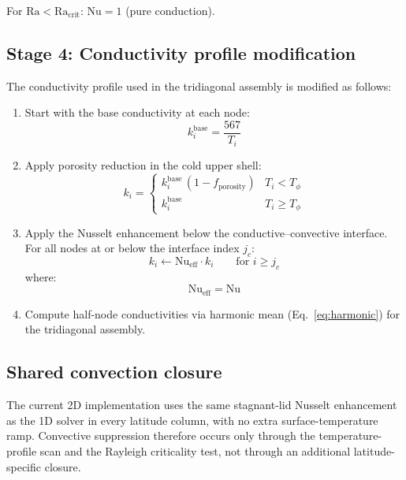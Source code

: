 \documentclass[11pt,a4paper]{article}
\newcommand{\Ra}{\mathrm{Ra}}
\newcommand{\Nu}{\mathrm{Nu}}
\begin{document}
For $\Ra < \Ra_{\mathrm{crit}}$: $\Nu = 1$ (pure conduction).

\subsection{Stage 4: Conductivity profile modification}

The conductivity profile used in the tridiagonal assembly is modified
as follows:

\begin{enumerate}[leftmargin=2em]
\item Start with the base conductivity at each node:
\begin{equation}
k_i^{\mathrm{base}} = \frac{567}{T_i}
\end{equation}

\item Apply porosity reduction in the cold upper shell:
\begin{equation}
k_i = \begin{cases}
  k_i^{\mathrm{base}}\,(1 - f_{\mathrm{porosity}}) & T_i < T_\phi \\
  k_i^{\mathrm{base}} & T_i \geq T_\phi
\end{cases}
\end{equation}

\item Apply the Nusselt enhancement below the conductive--convective
      interface. For all nodes at or below the interface index $j_c$:
\begin{equation}
k_i \leftarrow \Nu_{\mathrm{eff}} \cdot k_i
  \qquad \text{for } i \geq j_c
\label{eq:kmod}
\end{equation}
where:
\begin{equation}
\Nu_{\mathrm{eff}} = \Nu
\label{eq:Nu_eff}
\end{equation}

\item Compute half-node conductivities via harmonic mean
      (Eq.~\ref{eq:harmonic}) for the tridiagonal assembly.
\end{enumerate}

\subsection{Shared convection closure}

The current 2D implementation uses the same stagnant-lid Nusselt
enhancement as the 1D solver in every latitude column, with no extra
surface-temperature ramp. Convective suppression therefore occurs only
through the temperature-profile scan and the Rayleigh criticality test,
not through an additional latitude-specific closure.
\end{document}
